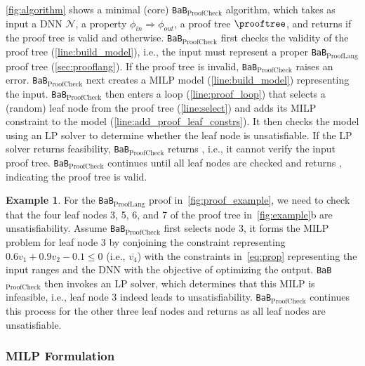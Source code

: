 \documentclass[oneside,11pt,dvipsnames]{book}
\numberwithin{equation}{section}
\theoremstyle{definition}
\newtheorem{example}{Example}[section]
\theoremstyle{remark}
\newcommand{\tvn}[1]{\iftoggle{usecomment}{{\color{red}{[TVN]: #1}}}{}}
\newcommand{\hd}[1]{\iftoggle{usecomment}{{\color{blue}{[HD]: #1}}}{}}
\newcommand{\prooflang}{\texttt{BaB$_{\text{ProofLang}}$}}
\newcommand{\proofcheck}{\texttt{BaB$_{\text{ProofCheck}}$}}
\begin{document}
\autoref{fig:algorithm} shows a minimal (core)  \proofcheck{} algorithm, which takes as input a DNN $\mathcal{N}$, a property $\phi_{in} \Rightarrow \phi_{out}$, a proof tree $\prooftree$, and returns \certified if the proof tree is valid and \uncertified otherwise. 
\proofcheck{} first checks the validity of the proof tree (\autoref{line:build_model}), i.e., the input must represent a proper \prooflang{} proof tree (\autoref{sec:prooflang}).  
If the proof tree is invalid, \proofcheck{} raises an error.
\proofcheck{} next creates a MILP model (\autoref{line:build_model}) representing the input. %
\proofcheck{} then enters a loop (\autoref{line:proof_loop}) that selects a (random) leaf node from the proof tree (\autoref{line:select}) and adds its MILP constraint to the model (\autoref{line:add_proof_leaf_constrs}). It then checks the model using an LP solver to determine whether the leaf node is unsatisfiable. If the LP solver returns feasibility, \proofcheck{} returns \uncertified, i.e., it cannot verify the input proof tree. 
\proofcheck{} continues until all leaf nodes are checked and returns \certified, indicating the proof tree is valid.



\begin{example} 
    For the \prooflang{} proof in~\autoref{fig:proof_example}, we need to check that the four leaf nodes 3, 5, 6, and 7 of the proof tree in~\autoref{fig:example}b are unsatisfiability. Assume \proofcheck{} first selects node 3, it forms the MILP problem for leaf node 3 by conjoining the constraint representing $0.6v_1 + 0.9v_2 - 0.1 \le 0$ (i.e., $\overline{v_4}$) %
with the constraints in~\autoref{eq:prop} representing the input ranges and the DNN with the objective of optimizing the output. \proofcheck{} then invokes an LP solver, which determines that this MILP is infeasible, i.e., leaf node 3 indeed leads to unsatisfiability. \proofcheck{} continues this process for the other three leaf nodes and returns \certified as all leaf nodes are unsatisfiable.
\end{example}

\subsubsection{MILP Formulation}\label{sec:milp-formulation}
\end{document}
